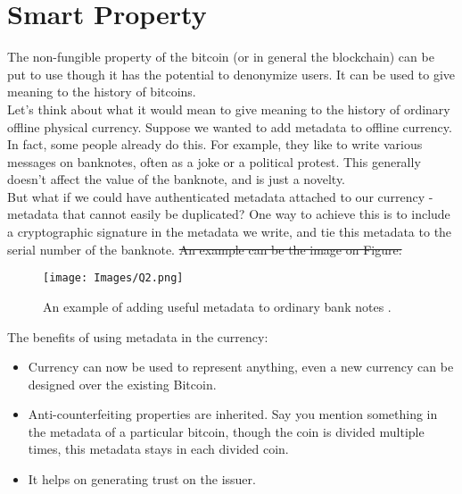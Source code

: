 \documentclass[10pt,a4paper]{article}
\begin{document}
\section{Smart Property}
The non-fungible property of the bitcoin (or in general the blockchain) can be put to use though it has the potential to denonymize users. It can be used to give meaning to the history of bitcoins.
\\

Let's think about what it would mean to give meaning to the history of ordinary offline physical currency. Suppose we wanted to add metadata to offline currency. In fact, some people already do this. For example, they like to write various messages on banknotes, often as a joke or a political protest. This generally doesn’t affect the value of the banknote, and is just a novelty.
\\

But what if we could have authenticated metadata attached to our currency - metadata that cannot easily be duplicated? One way to achieve this is to include a cryptographic signature in the metadata we write, and tie this metadata to the serial number of the banknote. \st{An example can be the image on Figure:} 
\\

\begin{figure}[H]
  \centering
  \texttt{[image: Images/Q2.png]}
  \caption{An example of adding useful metadata to ordinary bank notes \cite{textbook1}.}
  \label{Q2}
\end{figure}



The benefits of using metadata in the currency:
\begin{itemize}
    \item Currency can now be used to represent anything, even a new currency can be designed over the existing Bitcoin.
    \item Anti-counterfeiting properties are inherited. Say you mention something in the metadata of a particular bitcoin, though the coin is divided multiple times, this metadata stays in each divided coin.
    \item It helps on generating trust on the issuer. 
\end{itemize}
\end{document}
